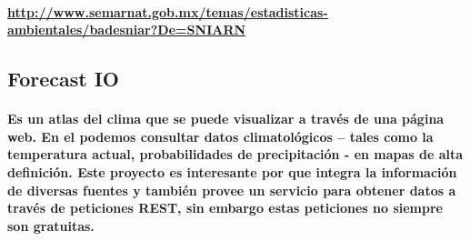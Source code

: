\paragraph {
\url {http://www.semarnat.gob.mx/temas/estadisticas-ambientales/badesniar?De=SNIARN}	
}
\subsection {Forecast IO}
\paragraph {Es un atlas del clima que se puede visualizar a través de una página web. En el podemos consultar datos climatológicos – tales como la temperatura actual, probabilidades de precipitación - en mapas de alta definición. Este proyecto es interesante por que integra la información de diversas fuentes y también provee un servicio para obtener datos a través de peticiones REST, sin embargo estas peticiones no siempre son gratuitas.}